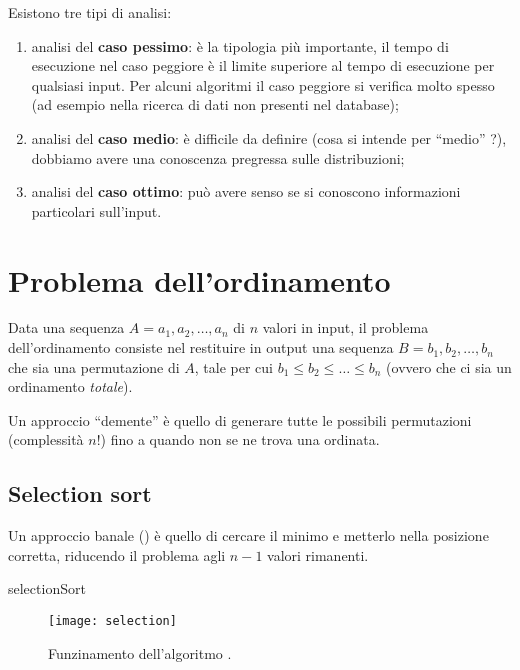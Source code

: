 Esistono tre tipi di analisi:
\begin{enumerate}
	\item analisi del \textbf{caso pessimo}: è la tipologia più importante, il tempo di esecuzione nel caso peggiore è il limite superiore al tempo di esecuzione per qualsiasi input. Per alcuni algoritmi il caso peggiore si verifica molto spesso (ad esempio nella ricerca di dati non presenti nel database);
	\item analisi del \textbf{caso medio}: è difficile da definire (cosa si intende per \enquote{medio} ?), dobbiamo avere una conoscenza pregressa sulle distribuzioni;
	\item analisi del \textbf{caso ottimo}: può avere senso se si conoscono informazioni particolari sull'input.
\end{enumerate}

\section*{Problema dell'ordinamento}

Data una sequenza \(A = a_1, a_2, \dots, a_n\) di \(n\) valori in input, il problema dell'ordinamento consiste nel restituire in output una sequenza \(B = b_1, b_2, \dots, b_n\) che sia una permutazione di \(A\), tale per cui \mbox{\(b_1 \leqslant b_2 \leqslant \dots \leqslant b_n\)} (ovvero che ci sia un ordinamento \emph{totale}).

Un approccio \enquote{demente} è quello di generare tutte le possibili permutazioni (complessità \(n!\)) fino a quando non se ne trova una ordinata.

\clearpage
\subsection{Selection sort}

Un approccio banale () è quello di cercare il minimo e metterlo nella posizione corretta, riducendo il problema agli \(n-1\) valori rimanenti.

\begin{algorithm}[H]
	\caption{selectionSort}
	
\end{algorithm}

\begin{figure}[H]\centering
	\texttt{[image: selection]}
	\caption[]{Funzinamento dell'algoritmo \selectionSort.}
\end{figure}

